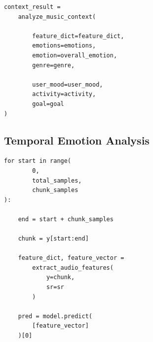 \documentclass[12pt,a4paper]{report}
\begin{document}
\begin{lstlisting}
context_result =
    analyze_music_context(

        feature_dict=feature_dict,
        emotions=emotions,
        emotion=overall_emotion,
        genre=genre,

        user_mood=user_mood,
        activity=activity,
        goal=goal
)
\end{lstlisting}

\subsection*{Temporal Emotion Analysis}

\begin{lstlisting}
for start in range(
        0,
        total_samples,
        chunk_samples
):

    end = start + chunk_samples

    chunk = y[start:end]

    feature_dict, feature_vector =
        extract_audio_features(
            y=chunk,
            sr=sr
        )

    pred = model.predict(
        [feature_vector]
    )[0]
\end{lstlisting}

\end{document}
